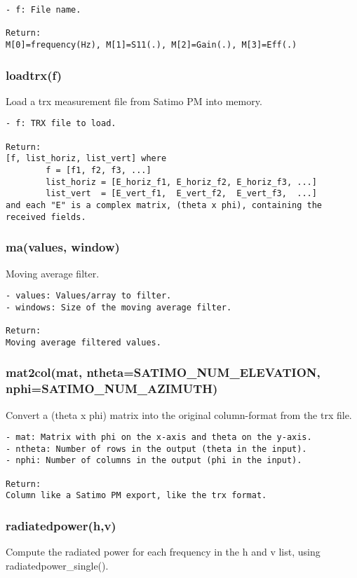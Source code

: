 \begin{verbatim}
- f: File name.

Return:
M[0]=frequency(Hz), M[1]=S11(.), M[2]=Gain(.), M[3]=Eff(.)
\end{verbatim}

\subsubsection{loadtrx(f)}
Load a trx measurement file from Satimo PM into memory. 

\begin{verbatim}
- f: TRX file to load.

Return:
[f, list_horiz, list_vert] where
        f = [f1, f2, f3, ...]
        list_horiz = [E_horiz_f1, E_horiz_f2, E_horiz_f3, ...]
        list_vert  = [E_vert_f1,  E_vert_f2,  E_vert_f3,  ...]
and each "E" is a complex matrix, (theta x phi), containing the received fields.
\end{verbatim}

\subsubsection{ma(values, window)}
Moving average filter.

\begin{verbatim}
- values: Values/array to filter.
- windows: Size of the moving average filter.

Return:
Moving average filtered values.
\end{verbatim}

\subsubsection{mat2col(mat, ntheta=SATIMO\_NUM\_ELEVATION, nphi=SATIMO\_NUM\_AZIMUTH)}
Convert a (theta x phi) matrix into the original column-format from the trx
file.

\begin{verbatim}
- mat: Matrix with phi on the x-axis and theta on the y-axis.
- ntheta: Number of rows in the output (theta in the input).
- nphi: Number of columns in the output (phi in the input).

Return:
Column like a Satimo PM export, like the trx format.
\end{verbatim}

\subsubsection{radiatedpower(h,v)}
Compute the radiated power for each frequency in the h and v list, using
radiatedpower\_single().


